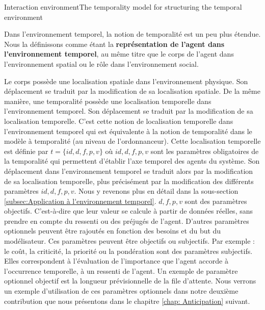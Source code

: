 \begin{frame}{Interaction environment}{The temporality model for structuring the temporal environment}
{ \par Dans l'environnement temporel, la notion de temporalité est un peu plus étendue. Nous la définissons comme étant la \textbf{représentation de l'agent dans l'environnement temporel}, au même titre que le corps de l'agent dans l'environnement spatial ou le rôle dans l'environnement social.
\par Le corps possède une localisation spatiale dans l'environnement physique. Son déplacement se traduit par la modification de sa localisation spatiale. De la même manière, une temporalité possède une localisation temporelle dans l'environnement temporel. Son déplacement se traduit par la modification de sa localisation temporelle. C'est cette notion de localisation temporelle dans l'environnement temporel qui est équivalente à la notion de temporalité dans le modèle à temporalité (au niveau de l'ordonnanceur). Cette localisation temporelle est définie par $t=\{id,d,f,p,v\}$ où $id,d,f,p,v$ sont les paramètres obligatoires de la temporalité qui permettent d'établir l'axe temporel des agents du système. Son déplacement dans l'environnement temporel se traduit alors par la modification de sa localisation temporelle, plus précisément par la modification des différents paramètres $id,d,f,p,v$. Nous y revenons plus en détail dans la sous-section \ref{subsec:Application à l'environnement temporel}. $d,f,p,v$ sont des paramètres objectifs. C'est-à-dire que leur valeur se calcule à partir de données réelles, sans prendre en compte du ressenti ou des préjugés de l'agent. D'autres paramètres optionnels peuvent être rajoutés en fonction des besoins et du but du modélisateur. Ces paramètres peuvent être objectifs ou subjectifs. Par exemple : le coût, la criticité, la priorité ou la pondération sont des paramètres subjectifs. Elles correspondent à l'évaluation de l'importance que l'agent accorde à l'occurrence temporelle, à un ressenti de l'agent. Un exemple de paramètre optionnel objectif est la longueur prévisionnelle de la file d'attente. Nous verrons un exemple d'utilisation de ces paramètres optionnels dans notre deuxième contribution que nous présentons dans le chapitre \ref{chap: Anticipation} suivant.
}
    
\end{frame}

